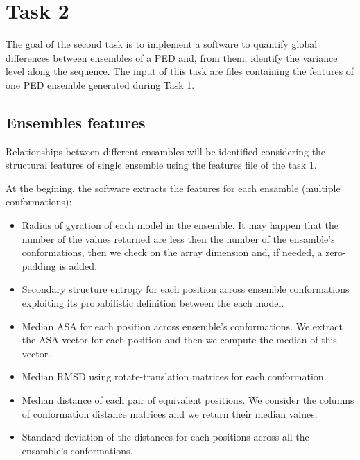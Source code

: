 \section{Task 2}\label{sec:task2}

The goal of the second task is to implement a software to quantify global differences between ensembles of a PED and, from them, identify the variance level along the sequence. The input of this task are files containing the features of one PED ensemble generated during Task 1.

\subsection{Ensembles features}
Relationships between different ensambles will be identified considering the structural features of single ensemble using the features file of the task 1.

At the begining, the software extracts the features for each ensamble (multiple conformations):
\begin{itemize}
\item Radius of gyration of each model in the ensemble. It may happen that the number of the values returned are less then the number of the ensamble's conformations, then we check on the array dimension and, if needed, a zero-padding is added.
\item Secondary structure entropy for each position across ensemble conformations exploiting its probabilistic definition between the each model. 
\item Median ASA for each position across ensemble's conformations. We extract the ASA vector for each position and then we compute the median of this vector. 
\item Median RMSD using rotate-translation matrices for each conformation.
\item Median distance of each pair of equivalent positions. We consider the columns of conformation distance matrices and we return their median values.
\item Standard deviation of the distances for each positions across all the ensamble's conformations.
\end{itemize}


